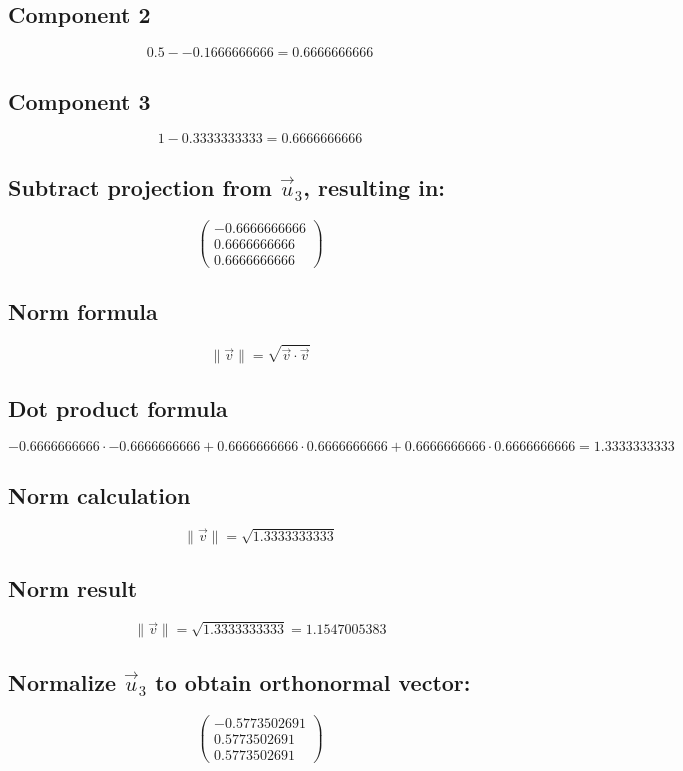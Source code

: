 \documentclass{article}
\begin{document}
\subsection*{ \vspace{1em} Component 2}
\[
0.5 - -0.1666666666 = 0.6666666666
\]
\subsection*{ \vspace{1em} Component 3}
\[
1 - 0.3333333333 = 0.6666666666
\]
\subsection*{ \vspace{1em} Subtract projection from \(\vec{u}_{3}\), resulting in:}
\[
\begin{pmatrix}-0.6666666666 \\ 0.6666666666 \\ 0.6666666666\end{pmatrix}
\]
\subsection*{ \vspace{1em} Norm formula}
\[
\|\vec{v}\| = \sqrt{\vec{v} \cdot \vec{v}}
\]
\subsection*{ \vspace{1em} Dot product formula}
\[
-0.6666666666 \cdot -0.6666666666 + 0.6666666666 \cdot 0.6666666666 + 0.6666666666 \cdot 0.6666666666 = 1.3333333333
\]
\subsection*{ \vspace{1em} Norm calculation}
\[
\|\vec{v}\| = \sqrt{1.3333333333}
\]
\subsection*{ \vspace{1em} Norm result}
\[
\|\vec{v}\| = \sqrt{1.3333333333} = 1.1547005383
\]
\subsection*{ \vspace{1em} Normalize \(\vec{u}_{3}\) to obtain orthonormal vector:}
\[
\begin{pmatrix}-0.5773502691 \\ 0.5773502691 \\ 0.5773502691\end{pmatrix}
\]
\end{document}

